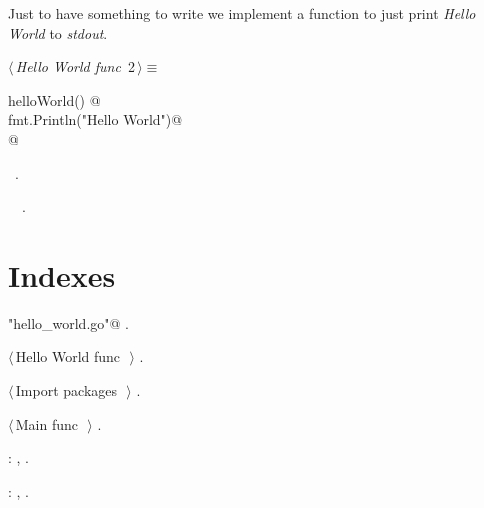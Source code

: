 \documentclass[a4paper]{report}
\begin{document}
\newpage
Just to have something to write we implement a function to just print \emph{
Hello World} to \textit{stdout}. 
\begin{flushleft} \small
\begin{minipage}{\linewidth}\label{scrap4}\raggedright\small
{} $\langle\,${\itshape Hello World func}\nobreak\ {\footnotesize {2}}$\,\rangle\equiv$
\vspace{-1ex}
\begin{list}{}{} \item
\mbox{}\lstinline@func helloWorld() {@\\
\mbox{}\lstinline@  fmt.Println("Hello World")@\\
\mbox{}\lstinline@}@\\
\mbox{}\lstinline@@{\NWsep}
\end{list}
\vspace{-1.5ex}
\footnotesize
\begin{list}{}{\setlength{\itemsep}{-\parsep}\setlength{\itemindent}{-\leftmargin}}
\item \NWtxtMacroRefIn\ .
\item \NWtxtIdentsDefed\nobreak\  \verb@helloWorld@\nobreak\ .
\item{}
\end{list}
\end{minipage}\vspace{4ex}
\end{flushleft}
\chapter{Indexes}


{\small\begin{list}{}{\setlength{\itemsep}{-\parsep}\setlength{\itemindent}{-\leftmargin}}
\item \verb@"hello_world.go"@ {\footnotesize {\NWtxtDefBy} .}
\end{list}}

{\small\begin{list}{}{\setlength{\itemsep}{-\parsep}\setlength{\itemindent}{-\leftmargin}}
\item $\langle\,$Hello World func\nobreak\ {\footnotesize {}}$\,\rangle$ {\footnotesize {\NWtxtRefIn} .}
\item $\langle\,$Import packages\nobreak\ {\footnotesize {}}$\,\rangle$ {\footnotesize {\NWtxtRefIn} .}
\item $\langle\,$Main func\nobreak\ {\footnotesize {}}$\,\rangle$ {\footnotesize {\NWtxtRefIn} .}
\end{list}}

{\small\begin{list}{}{\setlength{\itemsep}{-\parsep}\setlength{\itemindent}{-\leftmargin}}
\item \verb@helloWorld@: , \underline{}.
\item \verb@main@: , \underline{}.
\end{list}}
\end{document}
